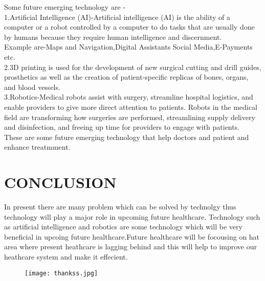 \documentclass[12pt]{report}
\begin{document}
\clearpage

Some future emerging technology are -\\

1.Artificial Intelligence (AI)-Artificial intelligence (AI) is the ability of a computer or a robot controlled by a computer to do tasks that are usually done by humans because they require human intelligence and discernment.\\
Example are-Maps and Navigation,Digital Assistants Social Media,E-Payments etc.\\
2.3D printing is used for the development of new surgical cutting and drill guides, prosthetics as well as the creation of patient-specific replicas of bones, organs, and blood vessels.\\
3.Robotics-Medical robots assist with surgery, streamline hospital logistics, and enable providers to give more direct attention to patients. Robots in the medical field are transforming how surgeries are performed, streamlining supply delivery and disinfection, and freeing up time for providers to engage with patients.\\

These are some future emerging technology that help doctors and patient and enhance treatmment.

\section{CONCLUSION}
In present there are many problem which can be solved by technolgy thus technology will play a major role in upcoming future healthcare. Technology such as artificial intelligence and robotics are some technology which will be very beneficial in upcoing future healthcare.Future healthcare will be focousing on hat area where present heathcare is lagging behind and this will help to improve our heathcare system and make it effecient.
\clearpage

\begin{figure}
\centering
\texttt{[image: thankss.jpg]}
\end{figure}











\clearpage
\end{document}
